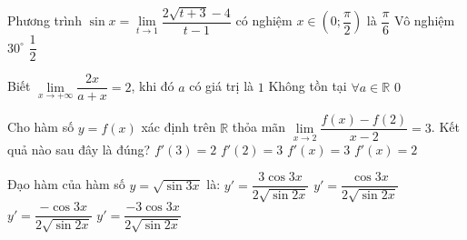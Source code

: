 \begin{ex}%
	Phương trình $ \sin x =  \lim\limits_{t \to 1}\dfrac{2\sqrt{t+3}-4}{t-1}$ có nghiệm $x \in \left(0; \dfrac{\pi}{2} \right)$ là 
	\choice
	{\True $\dfrac{\pi}{6}$}
	{Vô nghiệm}
	{$30^{\circ}$}
	{$\dfrac{1}{2}$}
	
\end{ex}
\begin{ex}%
	Biết $ \lim\limits_{x \to + \infty}\dfrac{2x}{a+x}=2$, khi đó $a$ có giá trị là
	\choice
	{$1$}
	{Không tồn tại}
	{\True $\forall a \in \mathbb{R}$}
	{$0$}
\end{ex}
\begin{ex}%
	Cho hàm số $y=f(x)$ xác định trên $\mathbb{R}$ thỏa mãn $ \lim\limits_{x \to 2} \dfrac{f(x)-f(2)}{x-2}=3$. Kết quả nào sau đây là đúng?
	\choice
	{$f'(3)=2$}
	{\True $f'(2)=3$}
	{$f'(x)=3$}
	{$f'(x)=2$}
\end{ex}
\begin{ex}%
	Đạo hàm của hàm số $ y=\sqrt{\sin 3x} $ là:
	\choice
	{\True $y'=\dfrac{3\cos 3x}{2\sqrt{\sin 2x}}$}
	{$y'=\dfrac{\cos 3x}{2\sqrt{\sin 2x}}$}
	{$y'=\dfrac{-\cos 3x}{2\sqrt{\sin 2x}}$}
	{$y'=\dfrac{-3\cos 3x}{2\sqrt{\sin 2x}}$}
\end{ex}

